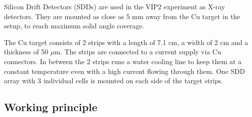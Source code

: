 Silicon Drift Detectors (SDDs) are used in the VIP2 experiment as X-ray detectors. They are mounted as close as 5 mm away from the Cu target in the setup, to reach maximum solid angle coverage. 

The Cu target consists of 2 strips with a length of 7.1 cm, a width of 2 cm and a thickness of 50 $\mu$m. The strips are connected to a current supply via Cu connectors. In between the 2 strips runs a water cooling line to keep them at a constant temperature even with a high current flowing through them. One SDD array with 3 individual cells is mounted on each side of the target strips.

\subsection{Working principle}

